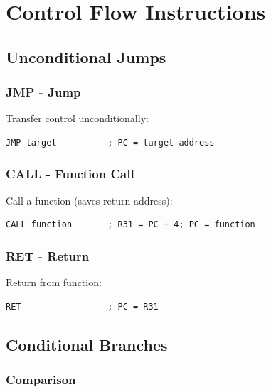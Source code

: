 \documentclass[12pt,a4paper,oneside]{book}
\begin{document}
\chapter{Control Flow Instructions}

\section{Unconditional Jumps}

\subsection{JMP - Jump}

Transfer control unconditionally:

\begin{lstlisting}[style=assembly]
JMP target          ; PC = target address
\end{lstlisting}

\subsection{CALL - Function Call}

Call a function (saves return address):

\begin{lstlisting}[style=assembly]
CALL function       ; R31 = PC + 4; PC = function
\end{lstlisting}

\subsection{RET - Return}

Return from function:

\begin{lstlisting}[style=assembly]
RET                 ; PC = R31
\end{lstlisting}

\section{Conditional Branches}

\subsection{Comparison}
\end{document}
